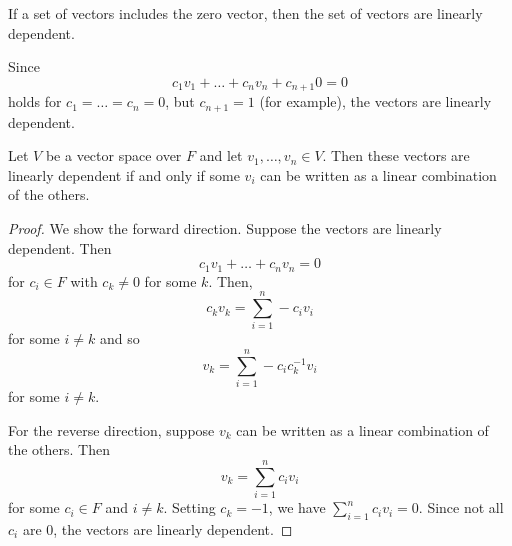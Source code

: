 \documentclass{article}
\begin{document}
\begin{proposition}
  If a set of vectors includes the zero vector, then the set of vectors are linearly dependent.

  Since \[
    c_1v_1 + \dots + c_nv_n + c_{n+1}0 = 0
  \]
  holds for $c_1 = \dots = c_n = 0$, but $c_{n+1} = 1$ (for example), the vectors are linearly dependent.
\end{proposition}
\begin{theorem}
  Let $V$ be a vector space over $F$ and let $v_1, \ldots, v_n \in V$. Then these vectors are linearly dependent if and only if some $v_i$ can be written as a linear combination of the others.
\end{theorem}
\begin{proof}
  We show the forward direction. Suppose the vectors are linearly dependent. Then \[
    c_1v_1 + \dots + c_nv_n = 0
  \]
  for $c_i \in F$ with $c_k \neq 0$ for some $k$.
  Then, \[
    c_kv_k = \sum_{i=1}^n -c_iv_i
  \]
  for some $i \neq k$
  and so \[
    v_k = \sum_{i=1}^n -c_ic_k^{-1}v_i
  \]
  for some $i \neq k$.

  For the reverse direction, suppose $v_k$ can be written as a linear combination of the others. Then \[
    v_k = \sum_{i=1}^n c_iv_i
  \]
  for some $c_i \in F$ and $i \neq k$. Setting $c_k = -1$, we have $\sum_{i=1}^n c_iv_i = 0$. Since not all $c_i$ are $0$, the vectors are linearly dependent.
\end{proof}
\end{document}
